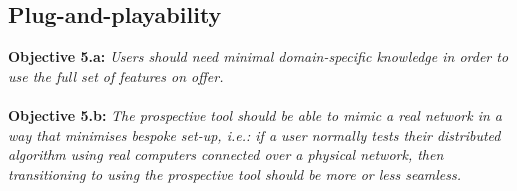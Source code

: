 \subsection{Plug-and-playability}\label{subsection:plug_and_playability}

\textbf{Objective 5.a: }\emph{Users should need minimal domain-specific knowledge in order to use the full set of
features on offer.} \\ \\
\textbf{Objective 5.b: }\emph{The prospective tool should be able to mimic a real network in a way that minimises
bespoke set-up, i.e.: if a user normally tests their distributed algorithm using real computers connected over a
physical network, then transitioning to using the prospective tool should be more or less seamless.}
